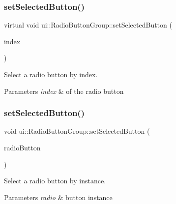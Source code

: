 \subsubsection{\texorpdfstring{set\+Selected\+Button()}{setSelectedButton()}\hspace{0.1cm}{\footnotesize\ttfamily [2/4]}}
{\footnotesize\ttfamily virtual void ui\+::\+Radio\+Button\+Group\+::set\+Selected\+Button (\begin{DoxyParamCaption}\item[{int}]{index }\end{DoxyParamCaption})\hspace{0.3cm}{\ttfamily [virtual]}}

Select a radio button by index.


\begin{DoxyParams}{Parameters}
{\em index} & of the radio button \\
\hline
\end{DoxyParams}
\mbox{\label{classui_1_1RadioButtonGroup_a72720e5dfe8a512dd39e0fd48e64e48f}} 
\subsubsection{\texorpdfstring{set\+Selected\+Button()}{setSelectedButton()}\hspace{0.1cm}{\footnotesize\ttfamily [3/4]}}
{\footnotesize\ttfamily void ui\+::\+Radio\+Button\+Group\+::set\+Selected\+Button (\begin{DoxyParamCaption}\item[{\hyperlink{classui_1_1RadioButton}{Radio\+Button} $\ast$}]{radio\+Button }\end{DoxyParamCaption})\hspace{0.3cm}{\ttfamily [virtual]}}

Select a radio button by instance.


\begin{DoxyParams}{Parameters}
{\em radio} & button instance \\
\hline
\end{DoxyParams}
\mbox{\label{classui_1_1RadioButtonGroup_ab62049446b2b438d0734fbe3b7357671}} 
